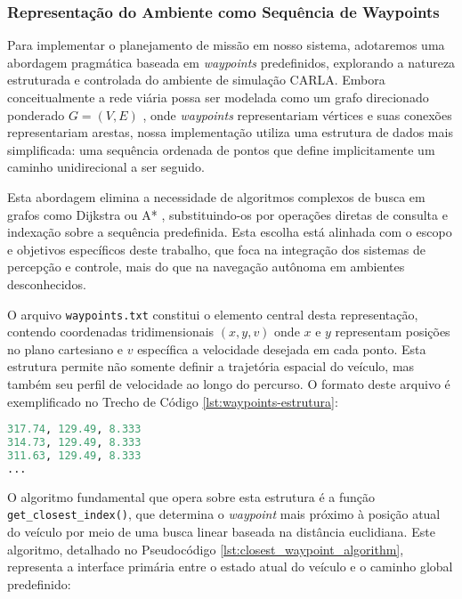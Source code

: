\subsubsection{Representação do Ambiente como Sequência de Waypoints} \label{subsubsec:representacao_grafo}

Para implementar o planejamento de missão em nosso sistema, adotaremos uma abordagem pragmática baseada em \textit{waypoints} predefinidos, explorando a natureza estruturada e controlada do ambiente de simulação CARLA. Embora conceitualmente a rede viária possa ser modelada como um grafo direcionado ponderado $G = (V, E)$ \cite{lavalle2006planning}, onde \textit{waypoints} representariam vértices e suas conexões representariam arestas, nossa implementação utiliza uma estrutura de dados mais simplificada: uma sequência ordenada de pontos que define implicitamente um caminho unidirecional a ser seguido.

Esta abordagem elimina a necessidade de algoritmos complexos de busca em grafos como Dijkstra ou A* \cite{nilsson1996artificial}, substituindo-os por operações diretas de consulta e indexação sobre a sequência predefinida. Esta escolha está alinhada com o escopo e objetivos específicos deste trabalho, que foca na integração dos sistemas de percepção e controle, mais do que na navegação autônoma em ambientes desconhecidos.

O arquivo \texttt{waypoints.txt} constitui o elemento central desta representação, contendo coordenadas tridimensionais $(x, y, v)$ onde $x$ e $y$ representam posições no plano cartesiano e $v$ específica a velocidade desejada em cada ponto. Esta estrutura permite não somente definir a trajetória espacial do veículo, mas também seu perfil de velocidade ao longo do percurso. O formato deste arquivo é exemplificado no Trecho de Código \ref{lst:waypoints-estrutura}:

\begin{lstlisting}[language=Python, caption=Estrutura do arquivo de \textit{waypoints} com coordenadas e velocidades associadas., label=lst:waypoints-estrutura]
317.74, 129.49, 8.333
314.73, 129.49, 8.333
311.63, 129.49, 8.333
...
\end{lstlisting}

O algoritmo fundamental que opera sobre esta estrutura é a função \texttt{get\_closest\_index()}, que determina o \textit{waypoint} mais próximo à posição atual do veículo por meio de uma busca linear baseada na distância euclidiana. Este algoritmo, detalhado no Pseudocódigo \ref{lst:closest_waypoint_algorithm}, representa a interface primária entre o estado atual do veículo e o caminho global predefinido:

